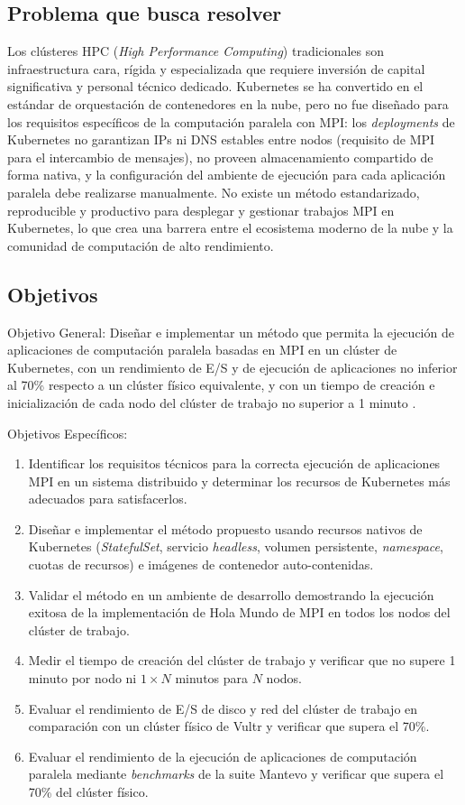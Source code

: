 \subsection{Problema que busca resolver}
Los clústeres HPC (\textit{High Performance Computing}) tradicionales son infraestructura cara, rígida y especializada que requiere inversión de capital significativa y personal técnico dedicado. Kubernetes se ha convertido en el estándar de orquestación de contenedores en la nube, pero no fue diseñado para los requisitos específicos de la computación paralela con MPI: los \textit{deployments} de Kubernetes no garantizan IPs ni DNS estables entre nodos (requisito de MPI para el intercambio de mensajes), no proveen almacenamiento compartido de forma nativa, y la configuración del ambiente de ejecución para cada aplicación paralela debe realizarse manualmente. No existe un método estandarizado, reproducible y productivo para desplegar y gestionar trabajos MPI en Kubernetes, lo que crea una barrera entre el ecosistema moderno de la nube y la comunidad de computación de alto rendimiento.

\subsection{Objetivos}

Objetivo General: Diseñar e implementar un método que permita la ejecución de aplicaciones de computación paralela basadas en MPI en un clúster de Kubernetes, con un rendimiento de E/S y de ejecución de aplicaciones no inferior al 70\% respecto a un clúster físico equivalente, y con un tiempo de creación e inicialización de cada nodo del clúster de trabajo no superior a 1 minuto \cite{arias2024}.

Objetivos Específicos:
\begin{enumerate}
    \item Identificar los requisitos técnicos para la correcta ejecución de aplicaciones MPI en un sistema distribuido y determinar los recursos de Kubernetes más adecuados para satisfacerlos.
    \item Diseñar e implementar el método propuesto usando recursos nativos de Kubernetes (\textit{StatefulSet}, servicio \textit{headless}, volumen persistente, \textit{namespace}, cuotas de recursos) e imágenes de contenedor auto-contenidas.
    \item Validar el método en un ambiente de desarrollo demostrando la ejecución exitosa de la implementación de Hola Mundo de MPI en todos los nodos del clúster de trabajo.
    \item Medir el tiempo de creación del clúster de trabajo y verificar que no supere 1 minuto por nodo ni $1 \times N$ minutos para $N$ nodos.
    \item Evaluar el rendimiento de E/S de disco y red del clúster de trabajo en comparación con un clúster físico de Vultr y verificar que supera el 70\%.
    \item Evaluar el rendimiento de la ejecución de aplicaciones de computación paralela mediante \textit{benchmarks} de la suite Mantevo y verificar que supera el 70\% del clúster físico.
\end{enumerate}

